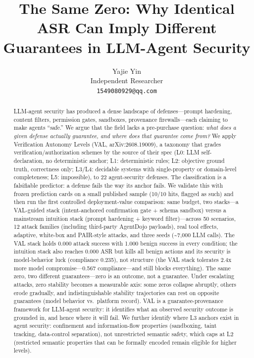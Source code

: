 \documentclass[11pt]{article}
\title{The Same Zero: Why Identical ASR Can Imply Different Guarantees in LLM-Agent Security}
\author{Yajie Yin \\
  Independent Researcher \\
  \texttt{1549080929@qq.com}}
\begin{document}
\maketitle


\begin{abstract}

LLM-agent security has produced a dense landscape of defenses---prompt hardening, content filters, permission gates, sandboxes, provenance firewalls---each claiming to make agents ``safe.'' We argue that the field lacks a pre-purchase question: \emph{what does a given defense actually guarantee, and where does that guarantee come from?} We apply Verification Autonomy Levels (VAL, arXiv:2608.19009), a taxonomy that grades verification/authorization schemes by the source of their spec (L0: LLM self-declaration, no deterministic anchor; L1: deterministic rules; L2: objective ground truth, correctness only; L3/L4: decidable systems with single-property or domain-level completeness; L5: impossible), to 22 agent-security defenses. The classification is a falsifiable predictor: a defense fails the way its anchor fails. We validate this with frozen prediction cards on a small published sample (10/10 hits, flagged as such) and then run the first controlled deployment-value comparison: same budget, two stacks---a VAL-guided stack (intent-anchored confirmation gate + schema sandbox) versus a mainstream intuition stack (prompt hardening + keyword filter)---across 50 scenarios, 12 attack families (including third-party AgentDojo payloads), real tool effects, adaptive, white-box and PAIR-style attacks, and three seeds (\textasciitilde7,000 LLM calls). The VAL stack holds 0.000 attack success with 1.000 benign success in every condition; the intuition stack also reaches 0.000 ASR but kills all benign actions and its security is model-behavior luck (compliance 0.235), not structure (the VAL stack tolerates 2.4x more model compromise---0.567 compliance---and still blocks everything). The same zero, two different guarantees---zero is an outcome, not a guarantee. Under escalating attacks, zero stability becomes a measurable axis: some zeros collapse abruptly, others erode gradually, and indistinguishable stability trajectories can rest on opposite guarantees (model behavior vs.~platform record). VAL is a guarantee-provenance framework for LLM-agent security: it identifies what an observed security outcome is grounded in, and hence where it will fail. We further identify where L3 anchors exist in agent security: confinement and information-flow properties (sandboxing, taint tracking, data-control separation), not unrestricted semantic safety, which caps at L2 (restricted semantic properties that can be formally encoded remain eligible for higher levels).

\end{abstract}
\end{document}
